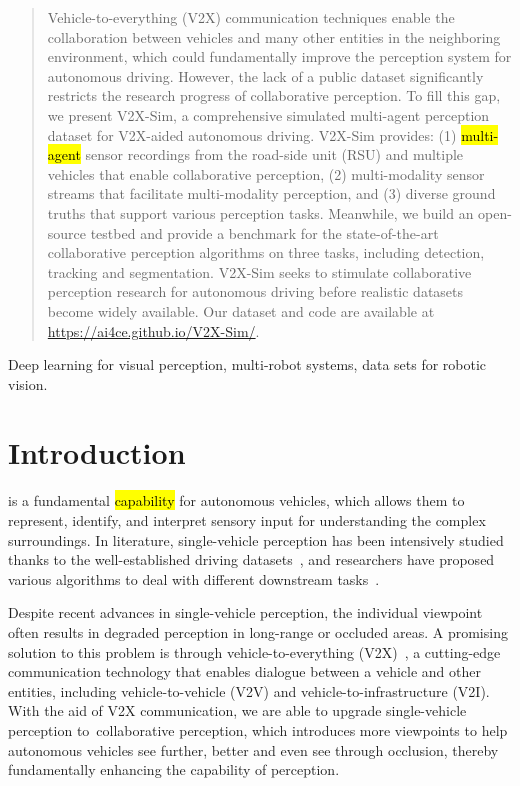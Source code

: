 \begin{abstract}
	Vehicle-to-everything (V2X) communication techniques enable the collaboration between vehicles and many other entities in the neighboring environment, which could fundamentally improve the perception system for autonomous driving. However, the lack of a public dataset significantly restricts the research progress of collaborative perception. To fill this gap, we present V2X-Sim, a comprehensive simulated multi-agent perception dataset for V2X-aided autonomous driving. V2X-Sim provides: (1) \hl{multi-agent} sensor recordings from the road-side unit (RSU) and multiple vehicles that enable collaborative perception, (2) multi-modality sensor streams that facilitate multi-modality perception, and (3) diverse ground truths that support various perception tasks. Meanwhile, we build an open-source testbed and provide a benchmark for the state-of-the-art collaborative perception algorithms on three tasks, including detection, tracking and segmentation. V2X-Sim seeks to stimulate collaborative perception research for autonomous driving before realistic datasets become widely available.  Our dataset and code are available at \url{https://ai4ce.github.io/V2X-Sim/}.
\end{abstract}

\begin{IEEEkeywords}
Deep learning for visual perception, multi-robot systems, data sets for robotic vision.
\end{IEEEkeywords}

\section{Introduction}\label{sec:intro}

 is a fundamental \hl{capability} for autonomous vehicles, which allows them to represent, identify, and interpret sensory input for understanding the complex surroundings. In literature, single-vehicle perception has been intensively studied thanks to the well-established driving datasets~\cite{Caesar2020nuScenesAM,Geiger2012AreWR,Sun2020ScalabilityIP}, and researchers have proposed various algorithms to deal with different downstream tasks~\cite{arnold2019survey,marvasti2021deep,Minaee2021ImageSU}. 

Despite recent advances in single-vehicle perception, the individual viewpoint often results in degraded perception in long-range or occluded areas. A promising solution to this problem is through vehicle-to-everything (V2X)~\cite{machardy2018v2x}, a cutting-edge communication technology that enables dialogue between a vehicle and other entities, including vehicle-to-vehicle (V2V) and vehicle-to-infrastructure (V2I). With the aid of V2X communication, we are able to upgrade single-vehicle perception to~{collaborative perception}, which introduces more viewpoints to help autonomous vehicles see further, better and even see through occlusion, thereby fundamentally enhancing the capability of perception. 

